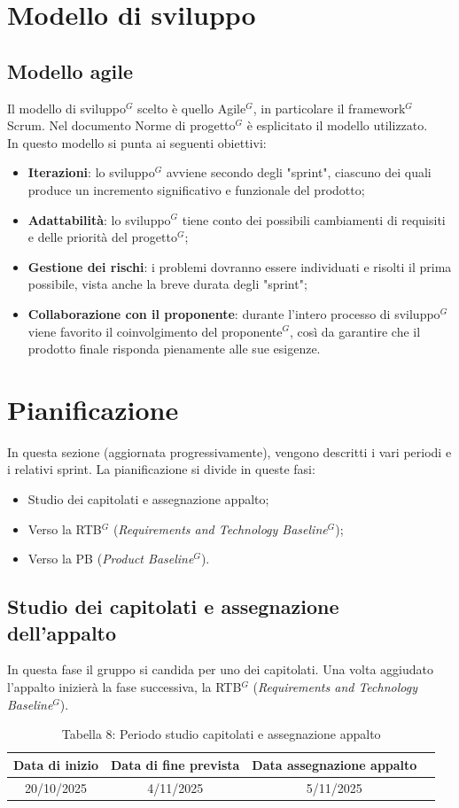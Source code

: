 \documentclass[a4paper,10pt]{article}
\begin{document}
\section{Modello di sviluppo}
\subsection{Modello agile}
Il modello di sviluppo$^G$ scelto è quello Agile$^G$, in particolare il framework$^G$ Scrum. Nel documento Norme di progetto$^G$ è esplicitato il modello utilizzato.\\ 
In questo modello si punta ai seguenti obiettivi:
\begin{itemize}
  \item \textbf{Iterazioni}: lo sviluppo$^G$ avviene secondo degli "sprint", ciascuno dei quali produce un incremento significativo e funzionale del prodotto;
  \item \textbf{Adattabilità}: lo sviluppo$^G$ tiene conto dei possibili cambiamenti di requisiti e delle priorità del progetto$^G$;
  \item \textbf{Gestione dei rischi}: i problemi dovranno essere individuati e risolti il prima possibile, vista anche la breve durata degli "sprint";
  \item \textbf{Collaborazione con il proponente}: durante l’intero processo di sviluppo$^G$ viene favorito il coinvolgimento del proponente$^G$, così da garantire che il prodotto finale risponda pienamente alle sue esigenze.
\end{itemize}


\section{Pianificazione}
In questa sezione (aggiornata progressivamente), vengono descritti i vari periodi e i relativi sprint. La pianificazione si divide in queste fasi:
\begin{itemize}
  \item Studio dei capitolati e assegnazione appalto;
  \item Verso la RTB$^G$ (\textit{Requirements and Technology Baseline$^G$});
  \item Verso la PB (\textit{Product Baseline$^G$}).
\end{itemize}
\subsection{Studio dei capitolati e assegnazione dell'appalto}
In questa fase il gruppo si candida per uno dei capitolati. Una volta aggiudato l'appalto inizierà la fase successiva, la RTB$^G$ (\textit{Requirements and Technology Baseline$^G$}).
\begin{table}[H]
\centering
\begin{tabular}{|c|c|c|c|}
\hline
\textbf{Data di inizio} & \textbf{Data di fine prevista} & \textbf{Data assegnazione appalto} \\
\hline
      20/10/2025 & 4/11/2025 & 5/11/2025 \\
\hline
\end{tabular}
\caption{Tabella 8: Periodo studio capitolati e assegnazione appalto}
\end{table}
\end{document}
